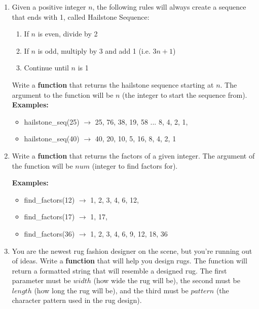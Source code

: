 \documentclass{article}
\begin{document}
\begin{enumerate}
	\item 
		Given a positive integer $n$, the following rules will always create a sequence that 
		ends with 1, called Hailstone Sequence:
		\begin{enumerate}
			\item If $n$ is even, divide by 2
			\item If $n$ is odd, multiply by 3 and add 1 (i.e. $3n+1$)
			\item Continue until $n$ is 1
		\end{enumerate}
		Write a \textbf{function} that returns the hailstone sequence starting at $n$. 
		The argument to the function will be $n$ (the integer to start the sequence from).
		\textbf{Examples:}		
		\begin{itemize}
			\item  hailstone\_seq(25) $\rightarrow$ 25, 76, 38, 19, 58 ... 8, 4, 2, 1, 
			\item  hailstone\_seq(40) $\rightarrow$ 40, 20, 10, 5, 16, 8, 4, 2, 1
		\end{itemize}



	\item 
		Write a \textbf{function} that returns the factors of a given integer. The argument of the function
		will be $num$ (integer to find factors for).

		\textbf{Examples:}		
		\begin{itemize}
			\item  find\_factors(12) $\rightarrow$ 1, 2, 3, 4, 6, 12, 
			\item  find\_factors(17) $\rightarrow$ 1, 17,
			\item  find\_factors(36) $\rightarrow$ 1, 2, 3, 4, 6, 9, 12, 18, 36
		\end{itemize}

	\item 
		You are the newest rug fashion designer on the scene, but you're running out of ideas. 
		Write a \textbf{function} that will help you design rugs.  The function will return a 
		formatted string that will resemble a designed rug. The first parameter must be $width$ 
		(how wide the rug will be), the second must be $length$ (how long the rug will be), 
		and the third must be $pattern$ (the character pattern used in the rug design).


\end{enumerate}
\end{document}
